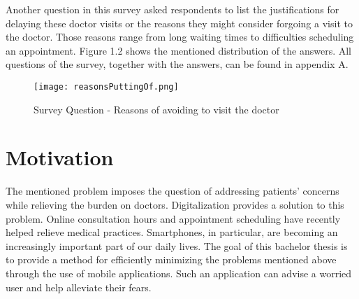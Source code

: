 \noindent 
Another question in this survey asked respondents to list the justifications for delaying these doctor visits or the reasons they might consider forgoing a visit to the doctor. Those reasons range from long waiting times to difficulties scheduling an appointment. Figure 1.2 shows the mentioned distribution of the answers. All questions of the survey, together with the answers, can be found in appendix A.
\begin{figure}[H]
	\centering
	\texttt{[image: reasonsPuttingOf.png]}
	\caption[Survey Question]{Survey Question - Reasons of avoiding to visit the doctor}
\end{figure}
\noindent 

\section{Motivation}
The mentioned problem imposes the question of addressing patients’ concerns while relieving the burden on doctors. Digitalization provides a solution to this problem. Online consultation hours and appointment scheduling have recently helped relieve medical practices. Smartphones, in particular, are becoming an increasingly important part of our daily lives. The goal of this bachelor thesis is to provide a method for efficiently minimizing the problems mentioned above through the use of mobile applications. Such an application can advise a worried user and help alleviate their fears.

